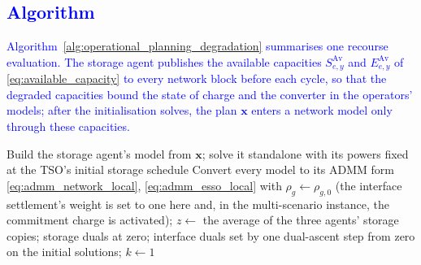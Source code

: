 \documentclass[preprint,12pt]{elsarticle}
\begin{document}
\subsection{\textcolor{blue}{Algorithm}}
\label{app:admm_updated_algorithm}

\textcolor{blue}{
    Algorithm~\ref{alg:operational_planning_degradation} summarises one recourse evaluation. The storage agent publishes the available capacities $S^{\text{Av}}_{e,y}$ and $E^{\text{Av}}_{e,y}$ of \eqref{eq:available_capacity} to every network block before each cycle, so that the degraded capacities bound the state of charge and the converter in the operators' models; after the initialisation solves, the plan $\boldsymbol{x}$ enters a network model only through these capacities.
}

\begin{algorithm}[htbp!]
    \caption{\textcolor{blue}{Consensus ADMM evaluation of a candidate plan with the shared-ESS agent}}
    \label{alg:operational_planning_degradation}
    \DontPrintSemicolon


    Build the storage agent's model from $\boldsymbol{x}$; solve it standalone with its powers fixed at the TSO's initial
    storage schedule\;
    Convert every model to its ADMM form \eqref{eq:admm_network_local}, \eqref{eq:admm_esso_local} with $\rho_g \gets \rho_{g,0}$ (the interface settlement's weight is set to one here and, in the multi-scenario instance, the commitment charge is activated); 
    $z \gets$ the average of the three agents' storage copies; storage duals at zero; interface duals set by one dual-ascent step from zero on the initial solutions; $k \gets 1$\;


\end{algorithm}
\end{document}
